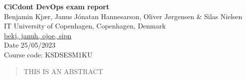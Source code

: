 \newcommand{\titleOfPaper}{CiCdont DevOps exam report}
\newcommand{\authorOfPaper}{Benjamin Kjær, Janus Jónatan Hannesarson, Oliver Jørgensen \& Silas Nielsen }
\newcommand{\authoremail}{bekj, januh, ojoe, sipn}
\newcommand{\coursecode}{KSDSESM1KU}
\newcommand{\handInDate}{25/05/2023}

\begin{center}
    \textbf{\huge \titleOfPaper} \\ \vspace{1em}
    \authorOfPaper \\ \vspace{1em}
    IT University of Copenhagen, Copenhagen, Denmark \\
    \href{mailto:\authoremail}{\authoremail} \\ \vspace{1em}
    Date \handInDate \\ \vspace{1em}
    Course code: \coursecode
\end{center} 

\begin{abstract}
    THIS IS AN ABSTRACT
\end{abstract}